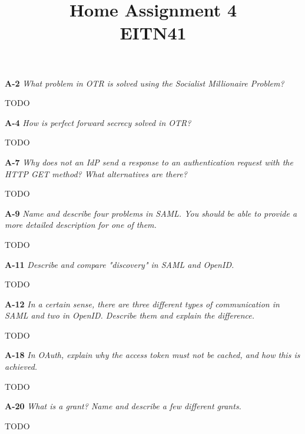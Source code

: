 \documentclass[a4paper]{article}
\title{Home Assignment 4 \\ EITN41}
\author{}
\date{}
\newcommand{\Q}[2]{ \vspace{10pt} \textbf{A-#1} \textit{#2} }
\newcommand{\A}[1]{ #1 }
\begin{document}
\maketitle

\Q{2} {
    What problem in OTR is solved using the Socialist Millionaire Problem?
}

\A{
    TODO
}

\Q{4} {
    How is perfect forward secrecy solved in OTR?
}

\A{
    TODO
}

\Q{7} {
    Why does not an IdP send a response to an authentication request with the 
    HTTP GET method? What alternatives are there?
}

\A{
    TODO
}

\Q{9} {
    Name and describe four problems in SAML. You should be able to provide a 
    more detailed description for one of them.
}

\A{
    TODO
}

\Q{11} {
    Describe and compare "discovery" in SAML and OpenID.
}

\A{
    TODO
}

\Q{12} {
    In a certain sense, there are three different types of communication in 
    SAML and two in OpenID. Describe them and explain the difference.
}

\A{
    TODO
}

\Q{18} {
    In OAuth, explain why the access token must not be cached, and how this is 
    achieved.
}

\A{
    TODO
}

\Q{20} {
    What is a grant? Name and describe a few different grants.
}

\A{
    TODO
}
\end{document}
